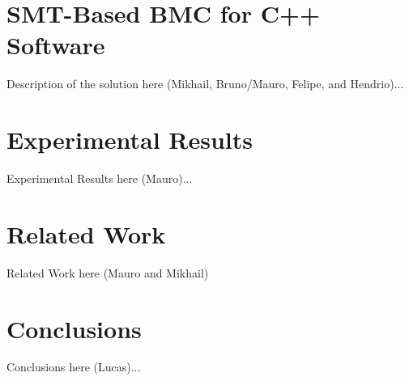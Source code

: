 \documentclass[a4paper]{llncs}
\begin{document}
\section{SMT-Based BMC for C++ Software}
%
Description of the solution here (Mikhail, Bruno/Mauro, Felipe, and Hendrio)...

\section{Experimental Results}
%
Experimental Results here (Mauro)...

\sourcecode {}

\section{Related Work}
%
Related Work here (Mauro and Mikhail)

\section{Conclusions}
%
Conclusions here (Lucas)...


\end{document}
